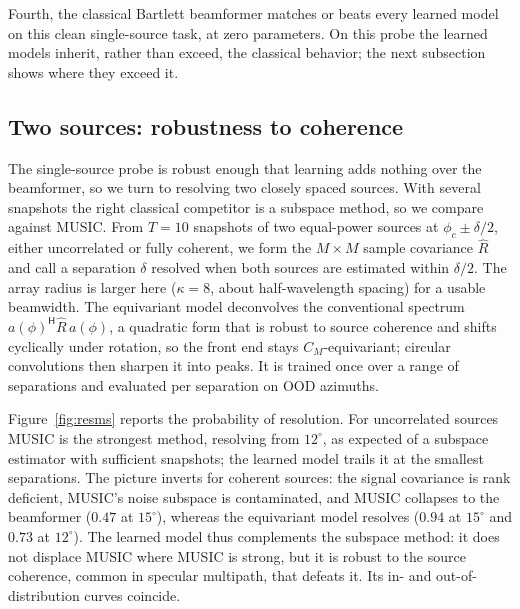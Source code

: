 \documentclass[conference]{IEEEtran}
\begin{document}
Fourth, the classical Bartlett beamformer matches or beats every learned model on
this clean single-source task, at zero parameters. On this probe the learned models
inherit, rather than exceed, the classical behavior; the next subsection shows where
they exceed it.

\subsection{Two sources: robustness to coherence}
The single-source probe is robust enough that learning adds nothing over the
beamformer, so we turn to resolving two closely spaced sources. With several
snapshots the right classical competitor is a subspace method, so we compare against
MUSIC. From $T{=}10$ snapshots of two equal-power sources at $\phi_c\pm\delta/2$,
either uncorrelated or fully coherent, we form the $M\times M$ sample covariance
$\hat{R}$ and call a separation $\delta$ resolved when both sources are estimated
within $\delta/2$. The array radius is larger here ($\kappa{=}8$, about
half-wavelength spacing) for a usable beamwidth. The equivariant model deconvolves
the conventional spectrum $a(\phi)^{\mathsf H}\hat{R}\,a(\phi)$, a quadratic form
that is robust to source coherence and shifts cyclically under rotation, so the
front end stays $C_M$-equivariant; circular convolutions then sharpen it into peaks.
It is trained once over a range of separations and evaluated per separation on OOD
azimuths.

Figure~\ref{fig:resms} reports the probability of resolution. For uncorrelated
sources MUSIC is the strongest method, resolving from $12^\circ$, as expected of a
subspace estimator with sufficient snapshots; the learned model trails it at the
smallest separations. The picture inverts for coherent sources: the signal
covariance is rank deficient, MUSIC's noise subspace is contaminated, and MUSIC
collapses to the beamformer ($0.47$ at $15^\circ$), whereas the equivariant model
resolves ($0.94$ at $15^\circ$ and $0.73$ at $12^\circ$). The learned model thus
complements the subspace method: it does not displace MUSIC where MUSIC is strong,
but it is robust to the source coherence, common in specular multipath, that defeats
it. Its in- and out-of-distribution curves coincide.

\end{document}
